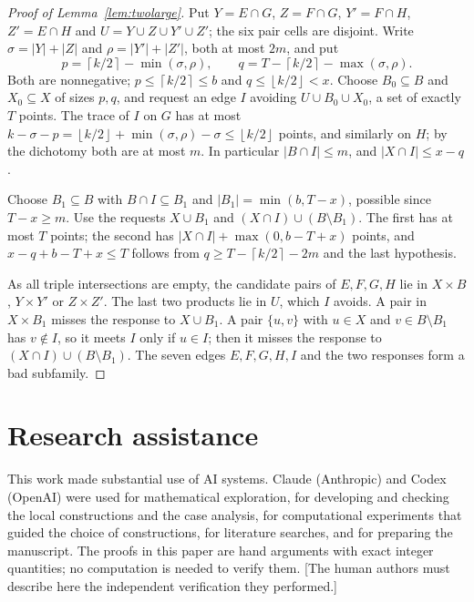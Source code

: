 \documentclass[11pt]{article}
\numberwithin{equation}{section}
\theoremstyle{definition}
\theoremstyle{remark}
\newcommand{\ceil}[1]{\left\lceil #1\right\rceil}
\newcommand{\floor}[1]{\left\lfloor #1\right\rfloor}
\begin{document}
\begin{proof}[Proof of Lemma~\ref{lem:twolarge}]
Put $Y=E\cap G$, $Z=F\cap G$, $Y'=F\cap H$, $Z'=E\cap H$ and
$U=Y\cup Z\cup Y'\cup Z'$; the six pair cells are disjoint. Write
$\sigma=|Y|+|Z|$ and $\rho=|Y'|+|Z'|$, both at most $2m$, and put
\[
 p=\ceil{k/2}-\min(\sigma,\rho),\qquad q=T-\ceil{k/2}-\max(\sigma,\rho).
\]
Both are nonnegative; $p\le\ceil{k/2}\le b$ and $q\le\floor{k/2}<x$.
Choose $B_0\subseteq B$ and $X_0\subseteq X$ of sizes $p,q$, and request
an edge $I$ avoiding $U\cup B_0\cup X_0$, a set of exactly $T$ points.
The trace of $I$ on $G$ has at most
$k-\sigma-p=\floor{k/2}+\min(\sigma,\rho)-\sigma\le\floor{k/2}$ points,
and similarly on $H$; by the dichotomy both are at most $m$. In
particular $|B\cap I|\le m$, and $|X\cap I|\le x-q$.

Choose $B_1\subseteq B$ with $B\cap I\subseteq B_1$ and
$|B_1|=\min(b,T-x)$, possible since $T-x\ge m$. Use the requests
$X\cup B_1$ and $(X\cap I)\cup(B\setminus B_1)$. The first has at most $T$
points; the second has $|X\cap I|+\max(0,b-T+x)$ points, and
$x-q+b-T+x\le T$ follows from $q\ge T-\ceil{k/2}-2m$ and the last
hypothesis.

As all triple intersections are empty, the candidate pairs of
$E,F,G,H$ lie in $X\times B$, $Y\times Y'$ or $Z\times Z'$. The last two
products lie in $U$, which $I$ avoids. A pair in $X\times B_1$ misses the
response to $X\cup B_1$. A pair $\{u,v\}$ with $u\in X$ and
$v\in B\setminus B_1$ has $v\notin I$, so it meets $I$ only if $u\in I$;
then it misses the response to $(X\cap I)\cup(B\setminus B_1)$. The seven
edges $E,F,G,H,I$ and the two responses form a bad subfamily.
\end{proof}

\section*{Research assistance}
This work made substantial use of AI systems. Claude (Anthropic) and
Codex (OpenAI) were used for mathematical exploration, for developing
and checking the local constructions and the case analysis, for
computational experiments that guided the choice of constructions, for
literature searches, and for preparing the manuscript. The proofs in
this paper are hand arguments with exact integer quantities; no
computation is needed to verify them. [The human authors must describe
here the independent verification they performed.]
\end{document}
